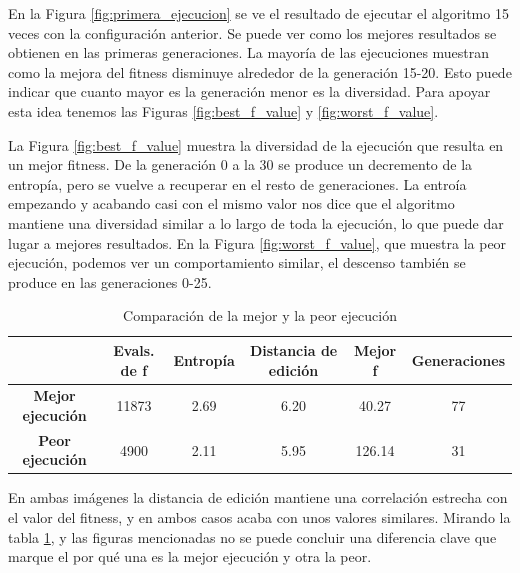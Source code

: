 En la Figura \ref{fig:primera_ejecucion} se ve el resultado de ejecutar el algoritmo 15 veces con la configuración anterior.
Se puede ver como los mejores resultados se obtienen en las primeras generaciones. La mayoría de las ejecuciones muestran como la mejora
del fitness disminuye alrededor de la generación 15-20. Esto puede indicar que cuanto mayor es la generación menor es la diversidad. 
Para apoyar esta idea tenemos las Figuras \ref{fig:best_f_value} y \ref{fig:worst_f_value}. 

La Figura \ref{fig:best_f_value} muestra la diversidad de la ejecución que resulta en un mejor fitness. De la generación 0 a la 30 se produce un decremento de la entropía,
pero se vuelve a recuperar en el resto de generaciones. La entroía empezando y acabando casi con el mismo valor nos dice que el algoritmo mantiene una diversidad similar a 
lo largo de toda la ejecución, lo que puede dar lugar a mejores resultados. En la Figura \ref{fig:worst_f_value}, que muestra la peor ejecución, podemos 
ver un comportamiento similar, el descenso también se produce en las generaciones 0-25. 

\begin{table}[]
    \begin{tabular}{|c|c|c|c|c|c|}
    \hline
                             & \textbf{Evals. de f} & \textbf{Entropía} & \textbf{Distancia de edición} & \textbf{Mejor f} & \textbf{Generaciones} \\ \hline
    \textbf{Mejor ejecución} & 11873                      & 2.69              & 6.20                          & 40.27                     & 77                    \\ \hline
    \textbf{Peor ejecución}  & 4900                       & 2.11              & 5.95                          & 126.14                    & 31                    \\ \hline
    \end{tabular}
    \caption{Comparación de la mejor y la peor ejecución}
    \label{fig:Comparación}
\end{table}

En ambas imágenes la distancia de edición mantiene una correlación estrecha con el valor del fitness, y en ambos casos acaba con unos valores similares. Mirando la tabla \ref{fig:Comparación}, y las figuras
mencionadas no se puede concluir una diferencia clave que marque el por qué una es la mejor ejecución y otra la peor.

